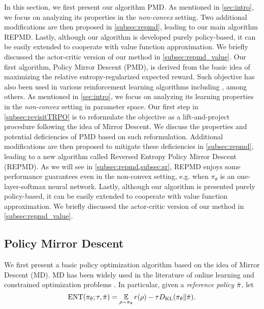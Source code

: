 In this section, we first present our algorithm PMD.
As mentioned in \cref{sec:intro}, we focus on analyzing its properties in the \emph{non-convex} setting.
Two additional modifications are then proposed in \cref{subsec:repmd}, leading to our main algorithm REPMD.
Lastly, although our algorithm is developed purely policy-based, it can be easily extended to cooperate with value function approximation. 
We briefly discussed the actor-critic version of our method in \cref{subsec:repmd_value}.
Our first algorithm, Policy Mirror Descent (PMD), is derived from the basic idea of maximizing the relative entropy-regularized expected reward. Such objective has also been used in various reinforcement learning algorithms including \citet{williams1991function,fox2015taming,schulman2017equivalence,nachum2017bridging,haarnoja2017reinforcement}, among others.
As mentioned in \cref{sec:intro}, we focus on analyzing its learning properties in the \emph{non-convex} setting in parameter space.
Our first step in \cref{subsec:revisitTRPO} is to reformulate the 
objective as a lift-and-project procedure following the idea of Mirror Descent. 
We discuss the properties and potential deficiencies of PMD based on such reformulation.
Additional modifications are then proposed  to mitigate these deficiencies in \cref{subsec:repmd}, leading to a new algorithm called Reversed Entropy Policy Mirror Descent (REPMD).
As we will see in \cref{subsec:repmd,subsec:sr}, REPMD enjoys some performance guarantees even in the non-convex setting, e.g. when $\pi_\theta$ is an one-layer-softmax neural network. 
Lastly, although our algorithm is presented purely policy-based, it can be easily extended to cooperate with value function approximation. 
We briefly discussed the actor-critic version of our method in \cref{subsec:repmd_value}.

\subsection{Policy Mirror Descent}
\label{sec:pmd}
We first present a basic policy optimization algorithm based on the idea of Mirror Descent (MD). MD has been widely used in the literature of online learning and constrained optimization problems \citep{nemirovskii1983problem,beck2003mirror}. In particular, given a \emph{reference policy} $\bar{\pi}$, let 
\begin{equation*}
\text{ENT}(\pi_\theta; \tau, \bar{\pi}) = { \operatorname*{\mathbb{E}}\limits_{\rho \sim \pi_\theta}{  r(\rho)  - \tau D_{\mathrm{KL}}(\pi_\theta \| \bar{\pi}) } }.
\end{equation*}

